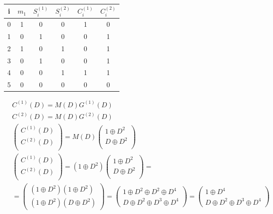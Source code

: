 \documentclass[12pt]{article}
\begin{document}
    \begin{table}[h]
       \centering 
        \begin{tabular}{cccccc}
            i & $m_1$ & $S_i^{(1)}$ & $S_i^{(2)}$ & $C_i^{(1)}$ & $C_i^{(2)}$  \\ \hline
            0 &  1    &  0          &   0         &  1          &  0  \\        
            1 &  0    &  1          &   0         &  0          &  1  \\  
            2 &  1    &  0          &   1         &  0          &  1  \\  
            3 &  0    &  1          &   0         &  0          &  1  \\  
            4 &  0    &  0          &   1         &  1          &  1  \\  
            5 &  0    &  0          &   0         &  0          &  0  \\   
        \end{tabular}
    \end{table}

    \begin{align*}
        & C^{(1)}(D) = M(D)G^{(1)}(D) \\ 
        & C^{(2)}(D) = M(D)G^{(2)}(D) \\ 
        & \begin{pmatrix}
            C^{(1)}(D) \\
            C^{(2)}(D) \\
        \end{pmatrix} = 
        M(D)\begin{pmatrix}
            1 \oplus D^2 \\
            D \oplus D^2 \\
        \end{pmatrix} \\
        & \begin{pmatrix}
            C^{(1)}(D) \\
            C^{(2)}(D) \\
        \end{pmatrix} =
        (1 \oplus D^2)
        \begin{pmatrix}
        1\oplus D^2 \\  
        D \oplus D^2 \\ 
        \end{pmatrix}=\\   
        & = \begin{pmatrix}
            (1\oplus D^2)(1\oplus D^2) \\
            (1 \oplus D^2)(D \oplus D^2) 
        \end{pmatrix} = 
        \begin{pmatrix}
            1\oplus D^2 \oplus D^2 \oplus D^4 \\
            D \oplus D^2 \oplus D^3 \oplus D^4
        \end{pmatrix} = 
        \begin{pmatrix}
            1 \oplus D^4 \\
            D \oplus D^2 \oplus D^3 \oplus D^4
        \end{pmatrix}
    \end{align*}
    
\end{document}

